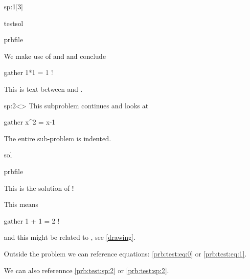 \begin{samproblem}
\begin{subproblem}{sp:1}[3]
  \begin{samwriteprbpart}{testsol}
    \begin{writeverbatim}{prbfile}
      \begin{samsolution}
        We make use of  and  and conclude
        \begin{sammath}{gather}
          1*1 = 1 !
        \end{sammath}%
      \end{samsolution}
    \end{writeverbatim}
  \end{samwriteprbpart}

\end{subproblem}

This is text between  and . 

\begin{subproblem}{sp:2}<>
  This subproblem continues  and looks at
  \begin{sammath}{gather}
    \quad \Black{\Rightarrow}\quad
    x^{2} = x-1\;\bdot
  \end{sammath}%
  The entire sub-problem is indented. 

  
  \begin{samwriteprbpart}{sol}
    \begin{writeverbatim}{prbfile}
      \begin{samsolution}
        This is the solution of !

        \begin{minipage}[c]{0.5\textwidth}
          This means
          \begin{sammath}{gather}
            1 + 1 = 2 !
          \end{sammath}%
          and this might be related to , see
          \cref{drawing}.
        \end{minipage}%
        \begin{minipage}[c]{0.5\textwidth}
        \end{minipage}%
      \end{samsolution}
    \end{writeverbatim}
  \end{samwriteprbpart}
\end{subproblem}

\end{samproblem}

\bigskip 

Outside the problem we can reference equations: \eqref{prb:test:eq:0} or 
\cref{prb:test:eq:1}.

We can also referennce \cref{prb:test:sp:2} or \ref{prb:test:sp:2}.
\bigskip


